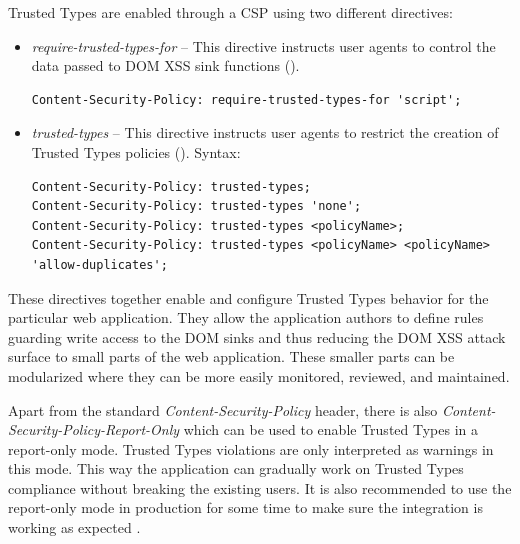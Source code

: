 Trusted Types are enabled through a CSP using two different directives:

\begin{itemize}
  \item \emph{require-trusted-types-for} -- This directive instructs user agents to control the
        data passed to DOM XSS sink functions (\cite{mdn:require-trusted-types-for}).

        \bigskip
        \begin{lstlisting}[language={}, caption=Syntax of \emph{require-trusted-types-for directive}]
Content-Security-Policy: require-trusted-types-for 'script';\end{lstlisting}

  \item \emph{trusted-types} -- This directive instructs user agents to restrict the creation of
        Trusted Types policies (\cite{mdn:trusted-types}). Syntax:

        \bigskip
        \begin{lstlisting}[language={}, caption=Syntax of \emph{trusted-types directive}]
Content-Security-Policy: trusted-types;
Content-Security-Policy: trusted-types 'none';
Content-Security-Policy: trusted-types <policyName>;
Content-Security-Policy: trusted-types <policyName> <policyName> 'allow-duplicates';\end{lstlisting}

\end{itemize}

These directives together enable and configure Trusted Types behavior for the particular web
application. They allow the application authors to define rules guarding write access to the DOM
sinks and thus reducing the DOM XSS attack surface to small parts of the web application. These
smaller parts can be modularized where they can be more easily monitored, reviewed, and maintained.

Apart from the standard \emph{Content-Security-Policy} header, there is also
\emph{Content-Security-Policy-Report-Only} which can be used to enable Trusted Types in a
report-only mode. Trusted Types violations are only interpreted as warnings in this mode. This way
the application can gradually work on Trusted Types compliance without breaking the existing users.
It is also recommended to use the report-only mode in production for some time to make sure the
integration is working as expected \cite{tt_web_framework_paper}.

